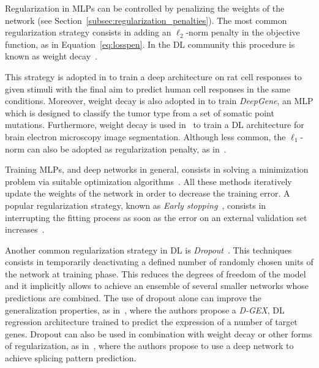     Regularization in MLPs can be controlled by penalizing the weights of the network (see Section~\ref{subsec:regularization_penalties}). The most common regularization strategy consists in adding an $\ell_2$-norm penalty in the objective function, as in Equation~\eqref{eq:losspen}. In the DL community this procedure is known as weight decay~\cite{krogh1992simple}.

    This strategy is adopted in \cite{Chen2015TransspeciesLO} to train a deep architecture on rat cell responses to given stimuli with the final aim to predict human cell responses in the same conditions.
    Moreover, weight decay is also adopted in \cite{Yuan2016DeepGeneAA} to train \textit{DeepGene}, \ie an MLP which is designed to classify the tumor type from a set of somatic point mutations.
    Furthermore, weight decay is used in~\cite{Fakhry2016DeepMF} to train a DL architecture for brain electron microscopy image segmentation.
    Although less common, the $\ell_1$-norm can also be adopted as regularization penalty, as in~\cite{leung2014deep}.

    Training MLPs, and deep networks in general, consists in solving a minimization problem via suitable optimization algorithms~\cite{ruder2016overview}. All these methods iteratively update the weights of the network in order to decrease the training error. A popular regularization strategy, known as  \textit{Early stopping}~\cite{prechelt1998early}, consists in interrupting the fitting process as soon as the error on an external validation set increases~\cite{angermueller2016deep}.

    Another common regularization strategy in DL is \textit{Dropout}~\cite{srivastava2014dropout}. This techniques consists in temporarily deactivating a defined number of randomly chosen units of the network at training phase. This reduces the degrees of freedom of the model and it implicitly allows to achieve an ensemble of several smaller networks whose predictions are combined.
    The use of dropout alone can improve the generalization properties, as in~\cite{Chen2016GeneEI}, where the authors propose a \textit{D-GEX}, DL regression architecture trained to predict the expression of a number of target genes. Dropout can also be used in combination with weight decay or other forms of regularization, as in~\cite{leung2014deep}, where the authors propose to use a deep network to achieve splicing pattern prediction.

